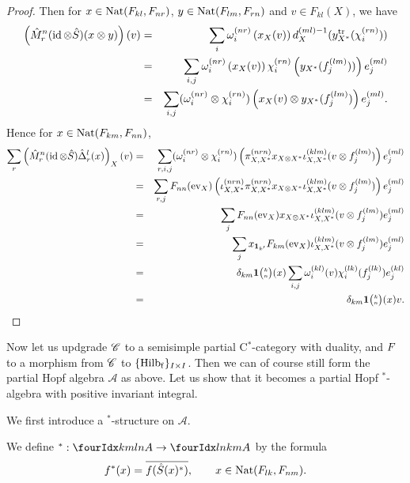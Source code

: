 \begin{proof}
Then for $x\in \operatorname{\mathrm{Nat}}(F_{kl},F_{nr})$, $y\in \operatorname{\mathrm{Nat}}(F_{lm},F_{rn})$ and $v \in F_{kl}(X)$, we have \begin{eqnarray*} \left(\hat{M}^n_r(\operatorname{id}\otimes \hat{S})(x\otimes y)\right)(v) &=& \sum_i \omega_i^{(nr)}\left(x_X(v)\right)  d_X^{(ml)-1}(y_{X^*}^{\operatorname{\mathrm{tr}}}(\chi_i^{(rn)}))\\ &=& \sum_{i,j} \omega_i^{(nr)}\left(x_X(v)\right)  \chi_i^{(rn)}\left(y_{X^*}(f_j^{(lm)}))\right)e_j^{(ml)} \\ &=& \sum_{i,j}(\omega_i^{(nr)}\otimes \chi_i^{(rn)})\left(x_X(v)\otimes y_{X^*}(f_j^{(lm)})\right)e_j^{(ml)}.\end{eqnarray*} Hence for $ x\in \operatorname{\mathrm{Nat}}(F_{km},F_{nn})$, \begin{eqnarray*} \sum_r \left(\hat{M}^n_r(\operatorname{id}\otimes \hat{S})\hat{\Delta}^l_r(x)\right)_X(v) &=& \sum_{r,i,j}(\omega_i^{(nr)}\otimes \chi_i^{(rn)})\left( \pi_{X, X^*}^{(nrn)}x_{X\otimes X^*}\iota_{X, X^*}^{(klm)}(v\otimes f_j^{(lm)})\right)e_j^{(ml)} \\ &=& \sum_{r,j} F_{nn}(\mathrm{ev}_X)\left(\iota_{X, X^*}^{(nrn)}\pi_{X, X^*}^{(nrn)}x_{X\otimes X^*}\iota_{X, X^*}^{(klm)}(v\otimes f_j^{(lm)})\right)e_j^{(ml)}\\ &=&  \sum_{j} F_{nn}(\mathrm{ev}_X)x_{X\otimes X^*}\iota_{X, X^*}^{(klm)}(v\otimes f_j^{(lm)})e_j^{(ml)}\\
&=& \sum_{j}x_{\mathbf{1}_{k'}} F_{km}(\mathrm{ev}_X)\iota_{X, X^*}^{(klm)}(v\otimes f_j^{(lm)})e_j^{(ml)}
\\ &=& \delta_{km} \mathbf{1}{\tiny {\begin{pmatrix} k\\n\end{pmatrix}}}(x)  \sum_{i,j}  \omega_i^{(kl)}(v)\chi_i^{(lk)}(f_j^{(lk)})e_j^{(kl)}\\
&=&  \delta_{km} \mathbf{1}{\tiny {\begin{pmatrix} k\\n\end{pmatrix}}}(x)  v.
\end{eqnarray*}
\end{proof} 

Now let us updgrade $\mathscr{C}$ to a semisimple partial C$^*$-category with duality, and $F$ to a morphism from $\mathscr{C}$ to $\{\mathrm{Hilb}_{\operatorname{\mathrm{f}}}\}_{I\times I}$. Then we can of course still form the partial Hopf algebra $\mathscr{A}$ as above. Let us show that it becomes a partial Hopf $^*$-algebra with positive invariant integral.

We first introduce a $^*$-structure on $\mathscr{A}$. 

\begin{Def} We define $^*: \Gr{A}{k}{l}{m}{n}\rightarrow \Gr{A}{l}{k}{n}{m}$ by the formula \[f^*(x) = \overline{f(\hat{S}(x)^*)},\qquad x\in \operatorname{\mathrm{Nat}}(F_{lk},F_{nm}).\]
\end{Def}

